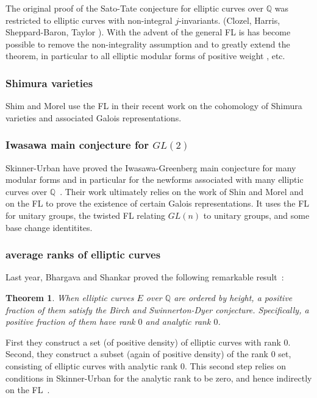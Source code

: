 \documentclass[brochure,english,12pt]{bourbaki}
\newtheorem{theorem}[equation]{Theorem}
\newcommand{\ring}[1]{\mathbb{#1}}
\begin{document}
The original proof of the Sato-Tate conjecture for elliptic curves over
$\ring{Q}$ was restricted to elliptic curves with non-integral
$j$-invariants.  (Clozel, Harris, Sheppard-Baron, Taylor \cite{XX}).
With the advent of the general FL is has become possible to remove
the non-integrality assumption and to greatly extend the theorem, in particular 
to all elliptic modular forms of positive weight \cite{Barnet-Lamb}, etc.



\subsubsection{Shimura varieties}

Shim and Morel use the FL in their recent work on the cohomology of Shimura varieties and associated
Galois representations.

\subsubsection{Iwasawa main conjecture for $GL(2)$}

Skinner-Urban have proved the Iwasawa-Greenberg main conjecture for
many modular forms and in particular for the newforms associated with
many elliptic curves over $\ring{Q}$~\cite{SU}.  Their work ultimately
relies on the work of Shin and Morel and on the FL to prove the
existence of certain Galois representations.  It uses the FL for unitary
groups, the twisted FL relating $GL(n)$ to unitary groups, and some
base change identitites.

\subsubsection{average ranks of elliptic curves}

Last year, Bhargava and Shankar proved the following remarkable result~\cite{BS}:

\begin{theorem} When elliptic curves $E$ over $\ring{Q}$ are ordered
  by height, a positive fraction of them satisfy the Birch and
  Swinnerton-Dyer conjecture.  Specifically, a positive fraction of them
  have rank $0$ and analytic rank $0$.
\end{theorem}

First they construct a set (of positive
density) of elliptic curves with rank $0$.  Second, they construct a
subset (again of positive density) of the rank $0$ set, consisting of
elliptic curves with analytic rank $0$.  This second step relies on
conditions in Skinner-Urban for the analytic rank to be zero, and hence
indirectly on the FL~\cite[Theorem~2]{SU}.
\end{document}
